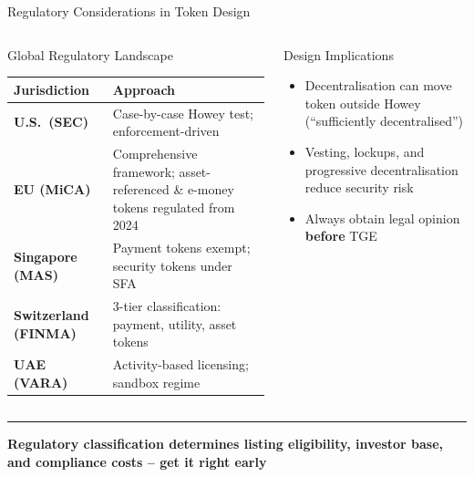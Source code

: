 \documentclass[8pt,aspectratio=169]{beamer}
\newcommand{\bottomnote}[1]{\vfill\vspace{-2mm}\textcolor{mllavender2}{\rule{\textwidth}{0.4pt}}\vspace{1mm}\footnotesize\textbf{#1}}
\begin{document}
\begin{frame}{Regulatory Considerations in Token Design}
\begin{columns}[T]
\begin{block}{Global Regulatory Landscape}
\footnotesize
\begin{tabular}{lp{4.2cm}}
\toprule
\textbf{Jurisdiction} & \textbf{Approach} \\
\midrule
\textbf{U.S.\ (SEC)} & Case-by-case Howey test; enforcement-driven \\
\textbf{EU (MiCA)} & Comprehensive framework; asset-referenced \& e-money tokens regulated from 2024 \\
\textbf{Singapore (MAS)} & Payment tokens exempt; security tokens under SFA \\
\textbf{Switzerland (FINMA)} & 3-tier classification: payment, utility, asset tokens \\
\textbf{UAE (VARA)} & Activity-based licensing; sandbox regime \\
\bottomrule
\end{tabular}
\end{block}
\vspace{1mm}
\begin{alertblock}{\footnotesize Design Implications}
\footnotesize
\begin{itemize}
  \item Decentralisation can move token outside Howey (``sufficiently decentralised'')
  \item Vesting, lockups, and progressive decentralisation reduce security risk
  \item Always obtain legal opinion \textbf{before} TGE
\end{itemize}
\end{alertblock}
\end{columns}
\bottomnote{Regulatory classification determines listing eligibility, investor base, and compliance costs -- get it right early}
\end{frame}
\end{document}
